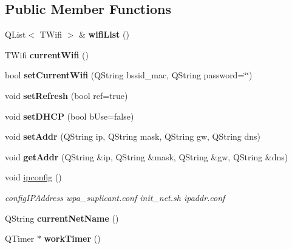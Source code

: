 \subsection*{Public Member Functions}
\begin{DoxyCompactItemize}
\item 
\mbox{\label{class_q_qt_ethenet_manager_a5d51e8e01fe560328f6e22237071f7ec}} 
Q\+List$<$ T\+Wifi $>$ \& {\bfseries wifi\+List} ()
\item 
\mbox{\label{class_q_qt_ethenet_manager_ae42b4efca1a95fe0fe628e54278061d9}} 
T\+Wifi {\bfseries current\+Wifi} ()
\item 
\mbox{\label{class_q_qt_ethenet_manager_aa775846127e09ad4803353fc53c062d0}} 
bool {\bfseries set\+Current\+Wifi} (Q\+String bssid\+\_\+mac, Q\+String password=\char`\"{}\char`\"{})
\item 
\mbox{\label{class_q_qt_ethenet_manager_a4aaa9312432e6054076778061831153e}} 
void {\bfseries set\+Refresh} (bool ref=true)
\item 
\mbox{\label{class_q_qt_ethenet_manager_a3ee154ddd357def5528da6afc985af49}} 
void {\bfseries set\+D\+H\+CP} (bool b\+Use=false)
\item 
\mbox{\label{class_q_qt_ethenet_manager_a77386353b7ca81c554807ab034de7cc9}} 
void {\bfseries set\+Addr} (Q\+String ip, Q\+String mask, Q\+String gw, Q\+String dns)
\item 
\mbox{\label{class_q_qt_ethenet_manager_a546f3e1be8ce3ed6ab8971d929e20984}} 
void {\bfseries get\+Addr} (Q\+String \&ip, Q\+String \&mask, Q\+String \&gw, Q\+String \&dns)
\item 
\mbox{\label{class_q_qt_ethenet_manager_a7ec667d769fbf71e144066260c70041b}} 
void \mbox{\hyperlink{class_q_qt_ethenet_manager_a7ec667d769fbf71e144066260c70041b}{ipconfig}} ()
\begin{DoxyCompactList}\small\item\em config\+I\+P\+Address wpa\+\_\+suplicant.\+conf init\+\_\+net.\+sh ipaddr.\+conf \end{DoxyCompactList}\item 
\mbox{\label{class_q_qt_ethenet_manager_a9b0b507497b069b45ba18a661046b4f4}} 
Q\+String {\bfseries current\+Net\+Name} ()
\item 
\mbox{\label{class_q_qt_ethenet_manager_adeb6db94e1a394e6a07d97ce48a6edea}} 
Q\+Timer $\ast$ {\bfseries work\+Timer} ()
\end{DoxyCompactItemize}
